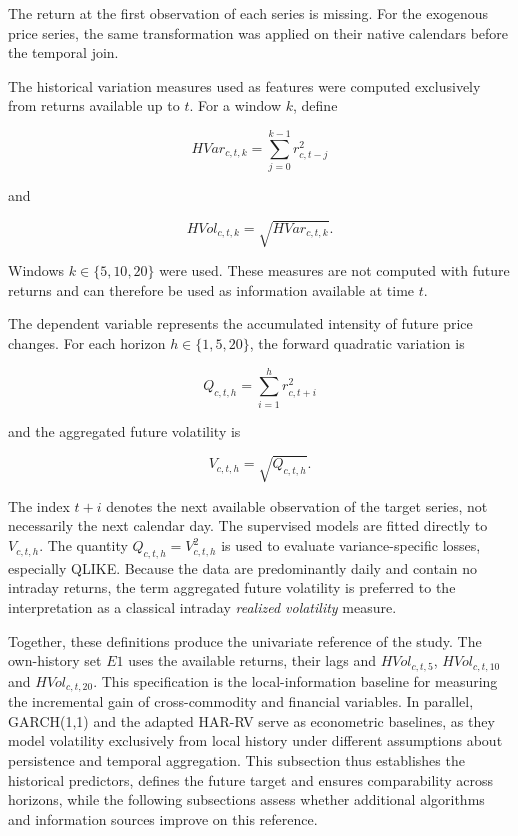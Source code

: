 \documentclass[a4paper,fleqn]{cas-sc}
\begin{document}
The return at the first observation of each series is missing. For the exogenous price series, the same transformation was applied on their native calendars before the temporal join.

The historical variation measures used as features were computed exclusively from returns available up to \(t\). For a window \(k\), define

\begin{equation}
HVar_{c,t,k}=\sum_{j=0}^{k-1}r_{c,t-j}^{2}
\label{eq:hist_var}
\end{equation}

and

\begin{equation}
HVol_{c,t,k}=\sqrt{HVar_{c,t,k}}.
\label{eq:hist_vol}
\end{equation}

Windows \(k\in\{5,10,20\}\) were used. These measures are not computed with future returns and can therefore be used as information available at time \(t\).

The dependent variable represents the accumulated intensity of future price changes. For each horizon \(h\in\{1,5,20\}\), the forward quadratic variation is

\begin{equation}
Q_{c,t,h}=\sum_{i=1}^{h}r_{c,t+i}^{2}
\label{eq:forward_variance}
\end{equation}

and the aggregated future volatility is

\begin{equation}
V_{c,t,h}=\sqrt{Q_{c,t,h}}.
\label{eq:forward_vol}
\end{equation}

The index \(t+i\) denotes the next available observation of the target series, not necessarily the next calendar day. The supervised models are fitted directly to \(V_{c,t,h}\). The quantity \(Q_{c,t,h}=V_{c,t,h}^{2}\) is used to evaluate variance-specific losses, especially QLIKE. Because the data are predominantly daily and contain no intraday returns, the term aggregated future volatility is preferred to the interpretation as a classical intraday \textit{realized volatility} measure.

Together, these definitions produce the univariate reference of the study. The own-history set \(E1\) uses the available returns, their lags and \(HVol_{c,t,5}\), \(HVol_{c,t,10}\) and \(HVol_{c,t,20}\). This specification is the local-information baseline for measuring the incremental gain of cross-commodity and financial variables. In parallel, GARCH(1,1) and the adapted HAR-RV serve as econometric baselines, as they model volatility exclusively from local history under different assumptions about persistence and temporal aggregation. This subsection thus establishes the historical predictors, defines the future target and ensures comparability across horizons, while the following subsections assess whether additional algorithms and information sources improve on this reference.
\end{document}
